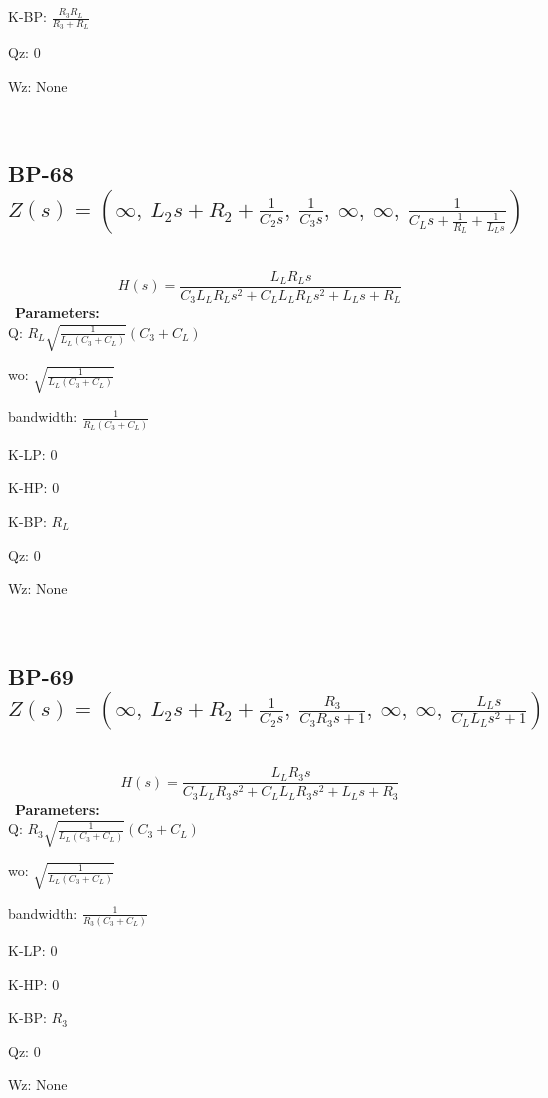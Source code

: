 \documentclass{article}
\begin{document}
K-BP: $\frac{R_{3} R_{L}}{R_{3} + R_{L}}$\ 

Qz: $0$\ 

Wz: $\text{None}$\ 

\ 

\subsection{BP-68 $Z(s) = \left( \infty, \  L_{2} s + R_{2} + \frac{1}{C_{2} s}, \  \frac{1}{C_{3} s}, \  \infty, \  \infty, \  \frac{1}{C_{L} s + \frac{1}{R_{L}} + \frac{1}{L_{L} s}}\right)$ } \ 
\textbf{\[H(s) = \frac{L_{L} R_{L} s}{C_{3} L_{L} R_{L} s^{2} + C_{L} L_{L} R_{L} s^{2} + L_{L} s + R_{L}}\] } \ 
\textbf{Parameters:}\\ 

Q: $R_{L} \sqrt{\frac{1}{L_{L} \left(C_{3} + C_{L}\right)}} \left(C_{3} + C_{L}\right)$\ 

wo: $\sqrt{\frac{1}{L_{L} \left(C_{3} + C_{L}\right)}}$\ 

bandwidth: $\frac{1}{R_{L} \left(C_{3} + C_{L}\right)}$\ 

K-LP: $0$\ 

K-HP: $0$\ 

K-BP: $R_{L}$\ 

Qz: $0$\ 

Wz: $\text{None}$\ 

\ 

\subsection{BP-69 $Z(s) = \left( \infty, \  L_{2} s + R_{2} + \frac{1}{C_{2} s}, \  \frac{R_{3}}{C_{3} R_{3} s + 1}, \  \infty, \  \infty, \  \frac{L_{L} s}{C_{L} L_{L} s^{2} + 1}\right)$ } \ 
\textbf{\[H(s) = \frac{L_{L} R_{3} s}{C_{3} L_{L} R_{3} s^{2} + C_{L} L_{L} R_{3} s^{2} + L_{L} s + R_{3}}\] } \ 
\textbf{Parameters:}\\ 

Q: $R_{3} \sqrt{\frac{1}{L_{L} \left(C_{3} + C_{L}\right)}} \left(C_{3} + C_{L}\right)$\ 

wo: $\sqrt{\frac{1}{L_{L} \left(C_{3} + C_{L}\right)}}$\ 

bandwidth: $\frac{1}{R_{3} \left(C_{3} + C_{L}\right)}$\ 

K-LP: $0$\ 

K-HP: $0$\ 

K-BP: $R_{3}$\ 

Qz: $0$\ 

Wz: $\text{None}$\ 
\end{document}

